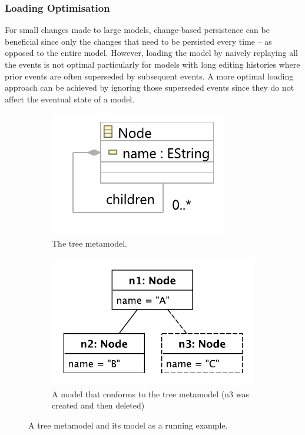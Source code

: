 \documentclass[12pt, a4paper]{report} \usepackage[titletoc]{appendix}
\begin{document}
\subsubsection{Loading Optimisation}
\label{loading_optimisation}
For small changes made to large models, change-based persistence can be beneficial since only the changes that need to be persisted every time -- as opposed to the entire model. However, loading the model by naively replaying all the events is not optimal particularly for models with long editing histories where prior events are often superseded by subsequent events. A more optimal loading approach can be achieved by ignoring those superseded events since they do not affect the eventual state of a model.

\begin{figure}[H]
    \begin{subfigure}[h]{0.4\linewidth}
        \centering
        \includegraphics[width=0.8\linewidth]{node_metamodel}
        \caption{The tree metamodel.}
        \label{fig:tree_metamodel}
    \end{subfigure}
    \hfill
    \begin{subfigure}[h]{0.6\linewidth}
        \centering
        \includegraphics[width=0.6\linewidth]{initial_chart}
        \caption{A model that conforms to the tree metamodel (n3 was created and then deleted)}
        \label{fig:initial_model}
    \end{subfigure}
    \caption{A tree metamodel and its model as a running example.}
    \label{fig:append_speed}
\end{figure}
\end{document}
